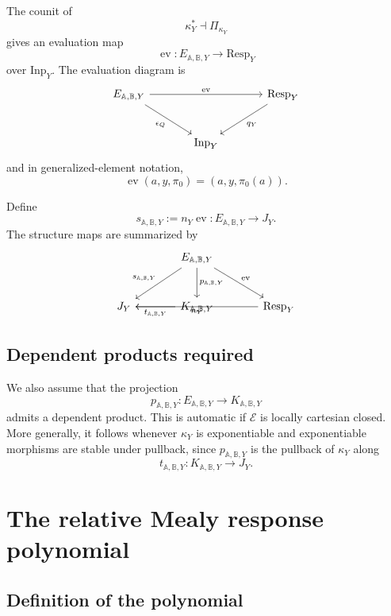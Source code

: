 The counit of
\[
\kappa_Y^\ast\dashv\Pi_{\kappa_Y}
\]
gives an evaluation map
\[
\operatorname{ev}:
E_{\mathbb A,\mathbb B,Y}\to \mathrm{Resp}_Y
\]
over \(\mathrm{Inp}_Y\).  The evaluation diagram is
\[
\begin{tikzcd}[column sep=large,row sep=large]
E_{\mathbb A,\mathbb B,Y}
  \arrow[rr,"\operatorname{ev}"]
  \arrow[dr,"\epsilon_Q"']
&&
\mathrm{Resp}_Y
  \arrow[dl,"q_Y"]
\\
&
\mathrm{Inp}_Y
&
\end{tikzcd}
\]
and in generalized-element notation,
\[
\operatorname{ev}(a,y,\pi_0)=(a,y,\pi_0(a)).
\]

Define
\[
s_{\mathbb A,\mathbb B,Y}
:=
n_Y\operatorname{ev}:
E_{\mathbb A,\mathbb B,Y}\to J_Y.
\]
The structure maps are summarized by
\[
\begin{tikzcd}[column sep=large,row sep=large]
&
E_{\mathbb A,\mathbb B,Y}
  \arrow[dl,"s_{\mathbb A,\mathbb B,Y}"']
  \arrow[d,"p_{\mathbb A,\mathbb B,Y}"]
  \arrow[dr,"\operatorname{ev}"]
&
\\
J_Y
&
K_{\mathbb A,\mathbb B,Y}
  \arrow[l,"t_{\mathbb A,\mathbb B,Y}"]
&
\mathrm{Resp}_Y
  \arrow[ll,"n_Y"]
\end{tikzcd}
\]

\subsection{Dependent products required}
\label{subsec:poly-relative-dependent-products-required}

We also assume that the projection
\[
p_{\mathbb A,\mathbb B,Y}:
E_{\mathbb A,\mathbb B,Y}\to K_{\mathbb A,\mathbb B,Y}
\]
admits a dependent product.  This is automatic if \(\mathcal E\) is locally
cartesian closed.  More generally, it follows whenever \(\kappa_Y\) is
exponentiable and exponentiable morphisms are stable under pullback, since
\(p_{\mathbb A,\mathbb B,Y}\) is the pullback of \(\kappa_Y\) along
\[
t_{\mathbb A,\mathbb B,Y}:K_{\mathbb A,\mathbb B,Y}\to J_Y.
\]

\section{The relative Mealy response polynomial}
\label{sec:poly-relative-response-polynomial}

\subsection{Definition of the polynomial}
\label{subsec:poly-relative-response-polynomial-definition}


